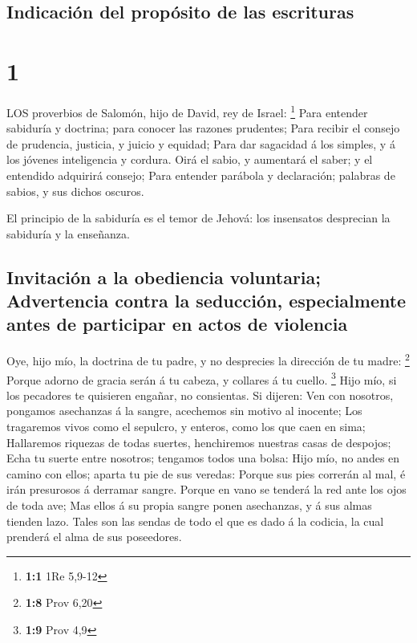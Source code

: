 \hypertarget{indicaciuxf3n-del-propuxf3sito-de-las-escrituras}{%
\subsection{Indicación del propósito de las
escrituras}\label{indicaciuxf3n-del-propuxf3sito-de-las-escrituras}}

\hypertarget{section}{%
\section{1}\label{section}}

 LOS proverbios de Salomón, hijo de David, rey de Israel:
\footnote{\textbf{1:1} 1Re 5,9-12}  Para entender sabiduría
y doctrina; para conocer las razones prudentes;  Para
recibir el consejo de prudencia, justicia, y juicio y equidad;
 Para dar sagacidad á los simples, y á los jóvenes
inteligencia y cordura.  Oirá el sabio, y aumentará el
saber; y el entendido adquirirá consejo;  Para entender
parábola y declaración; palabras de sabios, y sus dichos oscuros.

 El principio de la sabiduría es el temor de Jehová: los
insensatos desprecian la sabiduría y la enseñanza.

\hypertarget{invitaciuxf3n-a-la-obediencia-voluntaria-advertencia-contra-la-seducciuxf3n-especialmente-antes-de-participar-en-actos-de-violencia}{%
\subsection{Invitación a la obediencia voluntaria; Advertencia contra la
seducción, especialmente antes de participar en actos de
violencia}\label{invitaciuxf3n-a-la-obediencia-voluntaria-advertencia-contra-la-seducciuxf3n-especialmente-antes-de-participar-en-actos-de-violencia}}

 Oye, hijo mío, la doctrina de tu padre, y no desprecies la
dirección de tu madre: \footnote{\textbf{1:8} Prov 6,20} 
Porque adorno de gracia serán á tu cabeza, y collares á tu cuello.
\footnote{\textbf{1:9} Prov 4,9}  Hijo mío, si los
pecadores te quisieren engañar, no consientas.  Si dijeren:
Ven con nosotros, pongamos asechanzas á la sangre, acechemos sin motivo
al inocente;  Los tragaremos vivos como el sepulcro, y
enteros, como los que caen en sima;  Hallaremos riquezas de
todas suertes, henchiremos nuestras casas de despojos; 
Echa tu suerte entre nosotros; tengamos todos una bolsa: 
Hijo mío, no andes en camino con ellos; aparta tu pie de sus veredas:
 Porque sus pies correrán al mal, é irán presurosos á
derramar sangre.  Porque en vano se tenderá la red ante los
ojos de toda ave;  Mas ellos á su propia sangre ponen
asechanzas, y á sus almas tienden lazo.  Tales son las
sendas de todo el que es dado á la codicia, la cual prenderá el alma de
sus poseedores.

